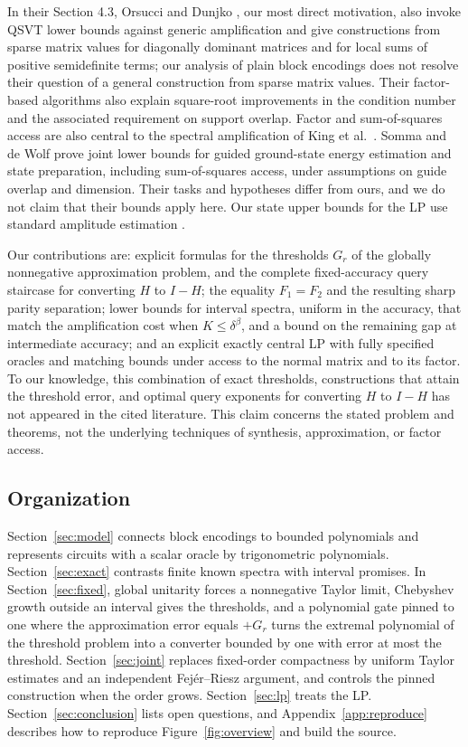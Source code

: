 In their Section 4.3, Orsucci and Dunjko \cite{orsucci2021}, our most direct motivation, also invoke QSVT lower bounds against generic amplification and give constructions from sparse matrix values for diagonally dominant matrices and for local sums of positive semidefinite terms; our analysis of plain block encodings does not resolve their question of a general construction from sparse matrix values. Their factor-based algorithms also explain square-root improvements in the condition number and the associated requirement on support overlap. Factor and sum-of-squares access are also central to the spectral amplification of King et al.\ \cite{king2026}. Somma and de Wolf \cite{somma2026} prove joint lower bounds for guided ground-state energy estimation and state preparation, including sum-of-squares access, under assumptions on guide overlap and dimension. Their tasks and hypotheses differ from ours, and we do not claim that their bounds apply here. Our state upper bounds for the LP use standard amplitude estimation \cite{brassard2002}.

Our contributions are: explicit formulas for the thresholds $G_r$ of the globally nonnegative approximation problem, and the complete fixed-accuracy query staircase for converting $H$ to $I-H$; the equality $F_1=F_2$ and the resulting sharp parity separation; lower bounds for interval spectra, uniform in the accuracy, that match the amplification cost when $K\leq\delta^\beta$, and a bound on the remaining gap at intermediate accuracy; and an explicit exactly central LP with fully specified oracles and matching bounds under access to the normal matrix and to its factor. To our knowledge, this combination of exact thresholds, constructions that attain the threshold error, and optimal query exponents for converting $H$ to $I-H$ has not appeared in the cited literature. This claim concerns the stated problem and theorems, not the underlying techniques of synthesis, approximation, or factor access.

\subsection{Organization}
Section~\ref{sec:model} connects block encodings to bounded polynomials and represents circuits with a scalar oracle by trigonometric polynomials. Section~\ref{sec:exact} contrasts finite known spectra with interval promises. In Section~\ref{sec:fixed}, global unitarity forces a nonnegative Taylor limit, Chebyshev growth outside an interval gives the thresholds, and a polynomial gate pinned to one where the approximation error equals $+G_r$ turns the extremal polynomial of the threshold problem into a converter bounded by one with error at most the threshold. Section~\ref{sec:joint} replaces fixed-order compactness by uniform Taylor estimates and an independent Fej\'er--Riesz argument, and controls the pinned construction when the order grows. Section~\ref{sec:lp} treats the LP. Section~\ref{sec:conclusion} lists open questions, and Appendix~\ref{app:reproduce} describes how to reproduce Figure~\ref{fig:overview} and build the source.
